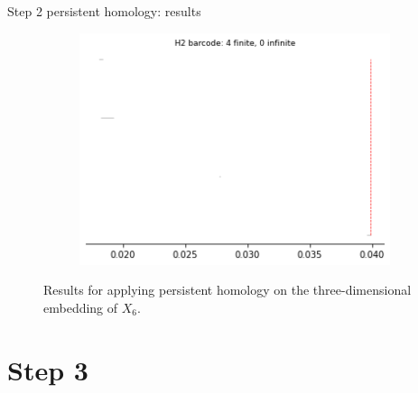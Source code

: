 \documentclass[xcolor={dvipsnames,svgnames}]{beamer}
\begin{document}
\begin{frame}{Step 2 persistent homology: results}
\begin{figure}[H]
\begin{subfigure}[b]{0.2\textwidth}
\includegraphics[width=\textwidth]{figures/X6_H2_barcode.png}
 \caption{}
\end{subfigure}
\caption{\scriptsize Results for applying persistent homology on the three-dimensional embedding of $X_6$.}
\end{figure}
\end{frame}

\section{Step 3}
\end{document}
